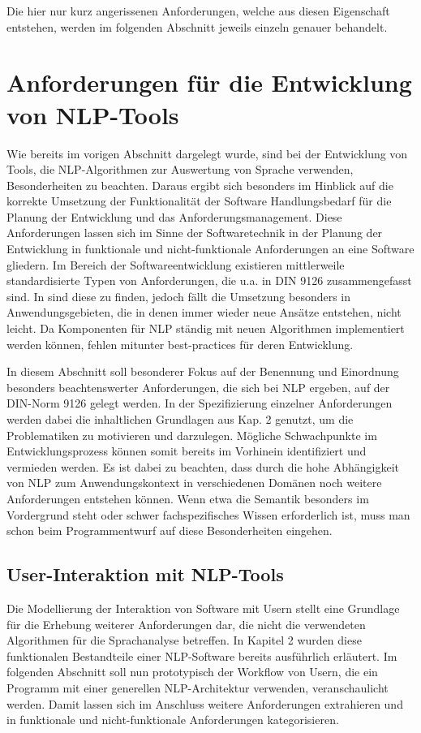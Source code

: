 \documentclass[12pt]{report}
\begin{document}
Die hier nur kurz angerissenen Anforderungen, welche aus diesen Eigenschaft entstehen, werden im folgenden Abschnitt jeweils einzeln genauer behandelt.

\section{Anforderungen für die Entwicklung von NLP-Tools}
Wie bereits im vorigen Abschnitt dargelegt wurde, sind bei der Entwicklung von Tools, die NLP-Algorithmen zur Auswertung von Sprache verwenden, Besonderheiten zu beachten. Daraus ergibt sich besonders im Hinblick auf die korrekte Umsetzung der Funktionalität der Software Handlungsbedarf für die Planung der Entwicklung und das Anforderungsmanagement. Diese Anforderungen lassen sich im Sinne der Softwaretechnik in der Planung der Entwicklung in funktionale und nicht-funktionale Anforderungen an eine Software gliedern. Im Bereich der Softwareentwicklung existieren mittlerweile standardisierte Typen von Anforderungen, die u.a. in DIN 9126 zusammengefasst sind. In \cite{bal98} sind diese zu finden, jedoch fällt die Umsetzung besonders in Anwendungsgebieten, die in denen immer wieder neue Ansätze entstehen, nicht leicht. Da Komponenten für NLP ständig mit neuen Algorithmen implementiert werden können, fehlen mitunter best-practices für deren Entwicklung.

In diesem Abschnitt soll besonderer Fokus auf der Benennung und Einordnung besonders beachtenswerter Anforderungen, die sich bei NLP ergeben, auf der DIN-Norm 9126 gelegt werden. In der Spezifizierung einzelner Anforderungen werden dabei die inhaltlichen Grundlagen aus Kap. 2 genutzt, um die Problematiken zu motivieren und darzulegen. Mögliche Schwachpunkte im Entwicklungsprozess können somit bereits im Vorhinein identifiziert und vermieden werden. Es ist dabei zu beachten, dass durch die hohe Abhängigkeit von NLP zum Anwendungskontext in verschiedenen Domänen noch weitere Anforderungen entstehen können. Wenn etwa die Semantik besonders im Vordergrund steht oder schwer fachspezifisches Wissen erforderlich ist, muss man schon beim Programmentwurf auf diese Besonderheiten eingehen.

\subsection{User-Interaktion mit NLP-Tools}
Die Modellierung der Interaktion von Software mit Usern stellt eine Grundlage für die Erhebung weiterer Anforderungen dar, die nicht die verwendeten Algorithmen für die Sprachanalyse betreffen. In Kapitel 2 wurden diese funktionalen Bestandteile einer NLP-Software  bereits ausführlich erläutert.
Im folgenden Abschnitt soll nun prototypisch der Workflow von Usern, die ein Programm mit einer generellen NLP-Architektur verwenden, veranschaulicht werden. Damit lassen sich im Anschluss weitere Anforderungen extrahieren und in funktionale und nicht-funktionale Anforderungen kategorisieren.
\end{document}
